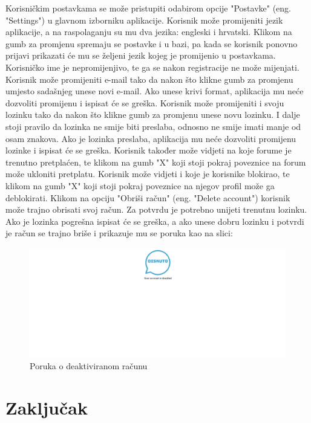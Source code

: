\documentclass{foi}
\begin{document}
Korisničkim postavkama se može pristupiti odabirom opcije "Postavke" (eng. "Settings") u glavnom izborniku aplikacije. Korisnik može promijeniti jezik aplikacije, a na raspolaganju su mu dva jezika: engleski i hrvatski. Klikom na gumb za promjenu spremaju se postavke i u bazi, pa kada se korisnik ponovno prijavi prikazati će mu se željeni jezik kojeg je promijenio u postavkama. Korisničko ime je nepromijenjivo, te ga se nakon registracije ne može mijenjati. Korisnik može promijeniti e-mail tako da nakon što klikne gumb za promjenu umjesto sadašnjeg unese novi e-mail. Ako unese krivi format, aplikacija mu neće dozvoliti promijenu i ispisat će se greška. Korisnik može promijeniti i svoju lozinku tako da nakon što klikne gumb za promjenu unese novu lozinku. I dalje stoji pravilo da lozinka ne smije biti preslaba, odnosno ne smije imati manje od osam znakova. Ako je lozinka preslaba, aplikacija mu neće dozvoliti promijenu lozinke i ispisat će se greška. Korisnik također može vidjeti na koje forume je trenutno pretplaćen, te klikom na gumb "X" koji stoji pokraj poveznice na forum može ukloniti pretplatu. Korisnik može vidjeti i koje je korisnike blokirao, te klikom na gumb "X" koji stoji pokraj poveznice na njegov profil može ga deblokirati. Klikom na opciju "Obriši račun" (eng. "Delete account") korisnik može trajno obrisati svoj račun. Za potvrdu je potrebno unijeti trenutnu lozinku. Ako je lozinka pogrešna ispisat će se greška, a ako unese dobru lozinku i potvrdi je račun se trajno briše i prikazuje mu se poruka kao na slici:

\begin{figure}[h!]
    \centering
    \includegraphics[width=1\textwidth]{slike/deaktivacija.png}
    \caption{Poruka o deaktiviranom računu}
\end{figure}

\chapter{Zaključak}
\end{document}
